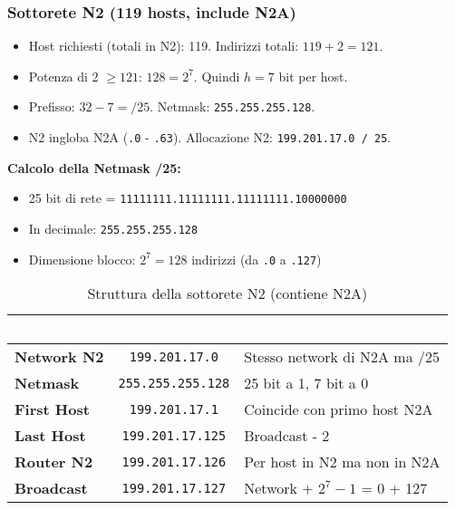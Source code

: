 \subsubsection{Sottorete N2 (119 hosts, include N2A)}
\begin{itemize}
    \item Host richiesti (totali in N2): 119. Indirizzi totali: $119 + 2 = 121$.
    \item Potenza di 2 $\geq 121$: $128 = 2^7$. Quindi $h=7$ bit per host.
    \item Prefisso: $32 - 7 = /25$. Netmask: \texttt{255.255.255.128}.
    \item N2 ingloba N2A (\texttt{.0} - \texttt{.63}). Allocazione N2: \texttt{199.201.17.0 / 25}.
\end{itemize}

\textbf{Calcolo della Netmask /25:}
\begin{itemize}
    \item 25 bit di rete = \texttt{11111111.11111111.11111111.10000000}
    \item In decimale: \texttt{255.255.255.128}
    \item Dimensione blocco: $2^7 = 128$ indirizzi (da \texttt{.0} a \texttt{.127})
\end{itemize}

\begin{table}[h]
\centering
\begin{tabular}{|l|c|l|}
\hline
\rowcolor{bg_custom}
\textcolor{white}{\textbf{Elemento}} & \textcolor{white}{\textbf{Indirizzo}} & \textcolor{white}{\textbf{Note}} \\
\hline
\textbf{Network N2} & \texttt{199.201.17.0} & Stesso network di N2A ma /25 \\
\hline
\textbf{Netmask} & \texttt{255.255.255.128} & 25 bit a 1, 7 bit a 0 \\
\hline
\textbf{First Host} & \texttt{199.201.17.1} & Coincide con primo host N2A \\
\hline
\textbf{Last Host} & \texttt{199.201.17.125} & Broadcast - 2 \\
\hline
\textbf{Router N2} & \texttt{199.201.17.126} & Per host in N2 ma non in N2A \\
\hline
\textbf{Broadcast} & \texttt{199.201.17.127} & Network + $2^7 - 1$ = 0 + 127 \\
\hline
\end{tabular}
\caption{Struttura della sottorete N2 (contiene N2A)}
\end{table}

